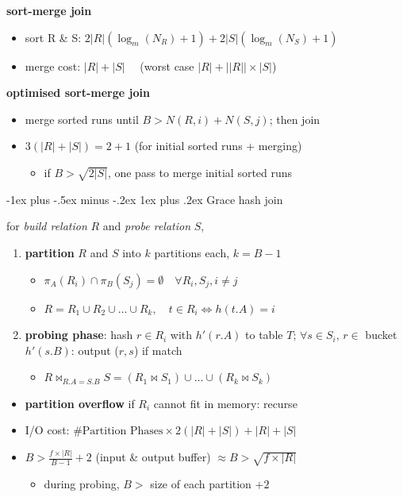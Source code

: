 \documentclass[10pt, landscape]{article}
\makeatletter
\renewcommand{\subsubsection}{\@startsection{subsubsection}{3}{0mm}%
  {-1ex plus -.5ex minus -.2ex}%
  {1ex plus .2ex}%
{\normalfont\small\bfseries}}%
\makeatother
\begin{document}
\begin{multicols*}{4}
  \textbf{sort-merge join}

  \begin{itemize}
    \item sort R \& S: $2|R| (\log_m(N_R)+1) + 2|S| (\log_m(N_S)+1)$
    \item merge cost: $|R| + |S| \quad$ (worst case $|R| + ||R||\times|S|$)
  \end{itemize}

  \textbf{optimised sort-merge join}

  \begin{itemize}
    \item merge sorted runs until $B > N(R, i) + N(S, j)$; then join
    \item $3(|R|+|S|) = 2+1$ (for initial sorted runs + merging)
      \begin{itemize}
        \item if $B > \sqrt{2|S|}$, one pass to merge initial sorted runs
      \end{itemize}
  \end{itemize}

  \subsubsection{Grace hash join}

  for \textit{build relation} $R$ and \textit{probe relation} $S$,
  \begin{enumerate}
    \item \textbf{partition} $R$ and $S$ into  $k$ partitions each, $k=B-1$
      \begin{itemize}
        \item $\pi_A(R_i) \cap \pi_B(S_j) = \emptyset \quad \forall R_i, S_j, i \neq j$
        \item $R = R_1 \cup R_2 \cup \dots \cup R_k, \quad t \in R_i \iff h(t.A)=i$
      \end{itemize}
    \item \textbf{probing phase}: hash $r \in R_i$ with $h'(r.A)$ to table $T$;
      $\forall s \in S_i$, $r \in$ bucket $h'(s.B)$: output ($r,s$) if match
      \begin{itemize}
        \item $R \bowtie_{R.A=S.B} S = (R_1 \bowtie S_1) \cup \dots \cup (R_k \bowtie S_k)$
      \end{itemize} 
  \end{enumerate}

  \begin{itemize}
    \item \textbf{partition overflow} if $R_i$ cannot fit in memory: recurse
    \item I/O cost: $\# \text{Partition Phases} \times 2(|R|+|S|) + |R|+|S| \quad$
    \item $B > \frac{f \times |R|}{B-1} + 2$ (input \& output buffer) $\approx B > \sqrt{f\times |R|}$
      \begin{itemize}
        \item during probing, $B >$ size of each partition $+ 2$
      \end{itemize}
  \end{itemize}


\end{multicols*}
\end{document}
